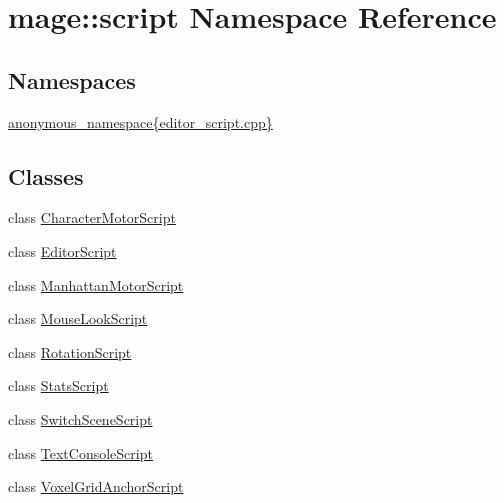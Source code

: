 \hypertarget{namespacemage_1_1script}{}\section{mage\+:\+:script Namespace Reference}
\label{namespacemage_1_1script}
\subsection*{Namespaces}
\begin{DoxyCompactItemize}
\item 
 \mbox{\hyperlink{namespacemage_1_1script_1_1anonymous__namespace_02editor__script_8cpp_03}{anonymous\+\_\+namespace\{editor\+\_\+script.\+cpp\}}}
\end{DoxyCompactItemize}
\subsection*{Classes}
\begin{DoxyCompactItemize}
\item 
class \mbox{\hyperlink{classmage_1_1script_1_1_character_motor_script}{Character\+Motor\+Script}}
\item 
class \mbox{\hyperlink{classmage_1_1script_1_1_editor_script}{Editor\+Script}}
\item 
class \mbox{\hyperlink{classmage_1_1script_1_1_manhattan_motor_script}{Manhattan\+Motor\+Script}}
\item 
class \mbox{\hyperlink{classmage_1_1script_1_1_mouse_look_script}{Mouse\+Look\+Script}}
\item 
class \mbox{\hyperlink{classmage_1_1script_1_1_rotation_script}{Rotation\+Script}}
\item 
class \mbox{\hyperlink{classmage_1_1script_1_1_stats_script}{Stats\+Script}}
\item 
class \mbox{\hyperlink{classmage_1_1script_1_1_switch_scene_script}{Switch\+Scene\+Script}}
\item 
class \mbox{\hyperlink{classmage_1_1script_1_1_text_console_script}{Text\+Console\+Script}}
\item 
class \mbox{\hyperlink{classmage_1_1script_1_1_voxel_grid_anchor_script}{Voxel\+Grid\+Anchor\+Script}}
\end{DoxyCompactItemize}
